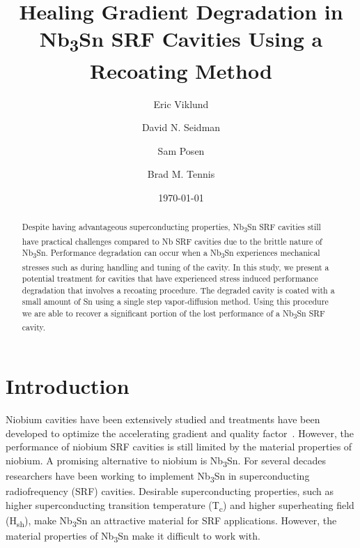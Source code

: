\documentclass{revtex4-2}
\begin{document}
\title{Healing Gradient Degradation in Nb\textsubscript{3}Sn SRF Cavities Using a Recoating Method}
\author{Eric Viklund}
\author{David N. Seidman}
\author{Sam Posen}
\author{Brad M. Tennis}


\date{\today}

\begin{abstract}

    Despite having advantageous superconducting properties, Nb\textsubscript{3}Sn SRF cavities still have practical challenges compared to Nb SRF cavities due to the brittle nature of Nb\textsubscript{3}Sn. Performance degradation can occur when a Nb\textsubscript{3}Sn experiences mechanical stresses such as during handling and tuning of the cavity. In this study, we present a potential treatment for cavities that have experienced stress induced performance degradation that involves a recoating procedure. The degraded cavity is coated with a small amount of Sn using a single step vapor-diffusion method. Using this procedure we are able to recover a significant portion of the lost performance of a Nb\textsubscript{3}Sn SRF cavity.

\end{abstract}

\maketitle

\section{Introduction}
\label{sec:Introduction}

Niobium cavities have been extensively studied and treatments have been developed to optimize the accelerating gradient and quality factor~\cite{10.1063/1.4866013, 10.1063/1.4960801, 10.1063/5.0059464, 10.1063/5.0063379}. However, the performance of niobium SRF cavities is still limited by the material properties of niobium. A promising alternative to niobium is Nb\textsubscript{3}Sn. For several decades researchers have been working to implement Nb\textsubscript{3}Sn in superconducting radiofrequency (SRF) cavities.\cite{10.1063/1.4913617, 10.1063/1.4913247} Desirable superconducting properties, such as higher superconducting transition temperature (T\textsubscript{c}) and higher superheating field (H\textsubscript{sh})\cite{liarte2017theoretical, catelani2008temperature, lin2012effect, kubo2020superfluid}, make Nb\textsubscript{3}Sn an attractive material for SRF applications. However, the material properties of Nb\textsubscript{3}Sn make it difficult to work with. 
\end{document}
